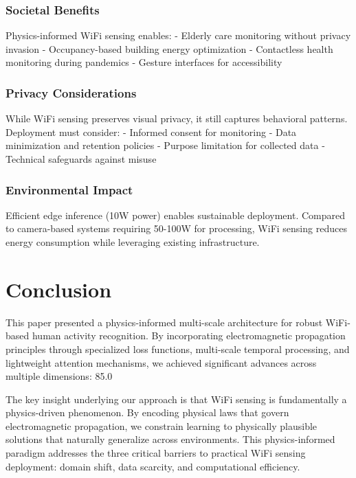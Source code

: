 \documentclass[10pt,journal,compsoc]{IEEEtran}
\begin{document}
\subsubsection{Societal Benefits}
Physics-informed WiFi sensing enables:
- Elderly care monitoring without privacy invasion
- Occupancy-based building energy optimization
- Contactless health monitoring during pandemics
- Gesture interfaces for accessibility

\subsubsection{Privacy Considerations}
While WiFi sensing preserves visual privacy, it still captures behavioral patterns. Deployment must consider:
- Informed consent for monitoring
- Data minimization and retention policies
- Purpose limitation for collected data
- Technical safeguards against misuse

\subsubsection{Environmental Impact}
Efficient edge inference (10W power) enables sustainable deployment. Compared to camera-based systems requiring 50-100W for processing, WiFi sensing reduces energy consumption while leveraging existing infrastructure.

\section{Conclusion}
\label{sec:conclusion}

This paper presented a physics-informed multi-scale architecture for robust WiFi-based human activity recognition. By incorporating electromagnetic propagation principles through specialized loss functions, multi-scale temporal processing, and lightweight attention mechanisms, we achieved significant advances across multiple dimensions: 85.0%

The key insight underlying our approach is that WiFi sensing is fundamentally a physics-driven phenomenon. By encoding physical laws that govern electromagnetic propagation, we constrain learning to physically plausible solutions that naturally generalize across environments. This physics-informed paradigm addresses the three critical barriers to practical WiFi sensing deployment: domain shift, data scarcity, and computational efficiency.
\end{document}
